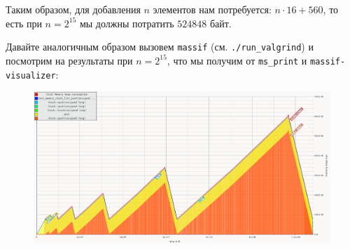 Таким образом, для добавления \(n\) элементов нам потребуется: \(n\cdot 16 + 560\), то есть при \(n = 2^{15}\) мы должны потратить \(524848\) байт.

Давайте аналогичным образом вызовем \texttt{massif} (см. \texttt{./run_valgrind}) и посмотрим на результаты при \(n = 2^{15}\), что мы получим от \texttt{ms_print} и \texttt{massif-visualizer}:
\begin{figure}[H]
  \centering
  \includegraphics[width=1.0\textwidth]{../../resources/memory_consumption_of_solver_2_benchmark_memory_stack.png}
  \caption{}
\end{figure}
